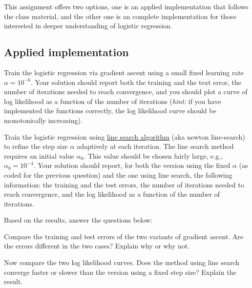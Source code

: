 \documentclass[12pt]{article}
\newenvironment{problem}[2][Problem:]{\begin{trivlist}
\item[\hskip \labelsep {\bfseries #1}\hskip \labelsep {\bfseries #2.}]}{\end{trivlist}}
\begin{document}
This assignment offers two options, one is an applied implementation that follows the class material, and the other one is an complete implementation for those interested in deeper understanding of logistic regression. 

\subsection{Applied implementation}
\begin{problem}{Programming: Naive Logistic Regression [13 points]}
Train the logistic regression via gradient ascent using a small fixed learning rate $\alpha = 10^{-6}$. Your solution should report both the training and the text error, the number of iterations needed to reach convergence, and you should plot a curve of log likelihood as a function of the number of iterations (\textit{hint:} if you have implemented the functions correctly, the log likelihood curve should be monotonically increasing).
\end{problem}

\begin{problem}{Programming: Line search optimization [8 points]}
Train the logistic regression using \href{https://en.wikipedia.org/wiki/Line_search}{line search algorithm} (aka newton line-search) to refine the step size $\alpha$ adaptively at each iteration. The line search method requires an initial value $\alpha_0$. This value should be chosen fairly large, e.g., $\alpha_0 = 10^{-4}$. Your solution should report, for both the version using the fixed $\alpha$ (as coded for the previous question) and the one using line search, the following information: the training and the test errors, the number of iterations needed to reach convergence, and the log likelihood as a function of the number of iterations. 
\end{problem}

Based on the results, answer the questions below:

\begin{problem}{Writing [2 points]}
Compare the training and test errors of the two variants of gradient ascent. Are the errors different in the two cases? Explain why or why not.
\end{problem}

\begin{problem}{Writing [2 points]}
Now compare the two log likelihood curves. Does the method using line search converge faster or slower than the version using a fixed step size? Explain the result.
\end{problem}


\pagebreak
\end{document}
